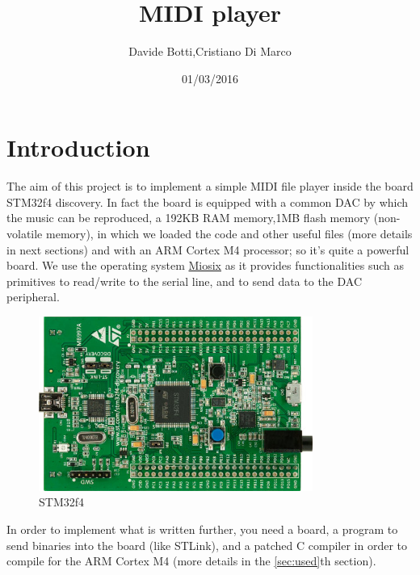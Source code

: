 \documentclass[12pt]{article}
\title{MIDI player}
\date{01/03/2016}
\author{Davide Botti,Cristiano Di Marco}
\begin{document}
\maketitle
{}
\pagestyle{fancy}
\fancyhead{}
\fancyfoot{}
\fancyfoot[R]{\thepage}
\newpage
{}
\tableofcontents

\newpage
\section{Introduction} \label{sec:intro}
 The aim of this project is to implement a simple MIDI file player inside the board STM32f4 discovery. In fact the board is equipped with a common DAC by which the music can be reproduced, a 192KB RAM memory,1MB flash memory (non-volatile memory), in which we loaded the code and other useful files (more details in next sections) and with an ARM Cortex M4 processor; so it's quite a powerful board. We use the operating system \href{https://miosix.org/}{Miosix} as it provides functionalities such as primitives to read/write to the serial line, and to send data to the DAC peripheral.\newline
 \begin{figure}[H]
 	\includegraphics[width=0.8\textwidth]{STM32F4-Discovery-Board.jpg}
 	\caption{STM32f4}
 	\label{fig:STM32f4Discovery}
 \end{figure}
In order to implement what is written further, you need a board, a program to send binaries into the board (like STLink), and a patched C compiler in order to compile for the ARM Cortex M4 (more details in the \ref{sec:used}th section).
\newpage
\end{document}
